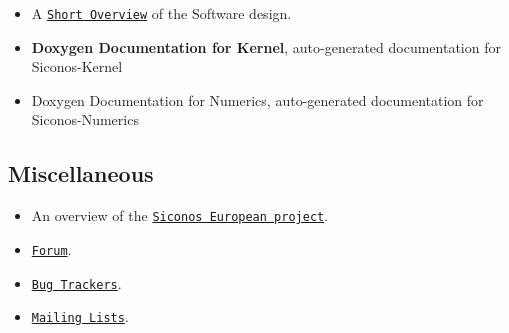 \begin{itemize}
\item A \href{http://siconos.gforge.inria.fr/Documentation/SiconosOverview/CapriSept2006.pdf}{\tt Short Overview} of the Software design.\end{itemize}


\begin{itemize}
\item {\bf Doxygen Documentation for Kernel}, auto-generated documentation for Siconos-Kernel\end{itemize}


\begin{itemize}
\item Doxygen Documentation for Numerics, auto-generated documentation for Siconos-Numerics\end{itemize}
\hypertarget{SiconosDocList_miscDoc}{}\subsection{Miscellaneous}\label{SiconosDocList_miscDoc}
\begin{itemize}
\item An overview of the \href{http://siconos.gforge.inria.fr/docDev/index.html}{\tt Siconos European project}.\end{itemize}


\begin{itemize}
\item \href{https://gforge.inria.fr/forum/?group_id=9}{\tt Forum}.\end{itemize}


\begin{itemize}
\item \href{https://gforge.inria.fr/tracker/?group_id=9}{\tt Bug Trackers}.\end{itemize}


\begin{itemize}
\item \href{https://gforge.inria.fr/mail/?group_id=9}{\tt Mailing Lists}. \end{itemize}
